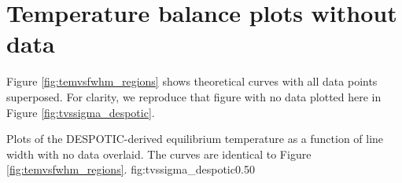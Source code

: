 \section{Temperature balance plots without data}
Figure \ref{fig:temvsfwhm_regions} shows theoretical curves with all data
points superposed.  For clarity, we reproduce that figure with no data plotted
here in Figure \ref{fig:tvssigma_despotic}.

{Plots of the DESPOTIC-derived equilibrium temperature as a function of line
width with no data overlaid.  The curves are identical to Figure
\ref{fig:temvsfwhm_regions}.}
{fig:tvssigma_despotic}{0.5}{0}




